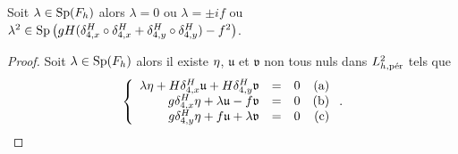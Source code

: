 \begin{proposition}
Soit $\lambda \in \Sp(F_h)$ alors $\lambda = 0$ ou $\lambda = \pm i f$ ou $\lambda^2 \in \Sp \left( gH (\delta_{4,x}^H \circ \delta_{4,x}^H + \delta_{4,y}^H \circ \delta_{4,y}^H) - f^2 \right)$.
\label{prop:spectre_F_h}
\end{proposition}

\begin{proof}
Soit $\lambda \in \Sp(F_h)$ alors il existe $\etafrak$, $\mathfrak{u}$ et $\mathfrak{v}$ non tous nuls dans $L^2_{h,\per}$ tels que
\begin{equation}
\left\lbrace
\begin{array}{rclr}
\lambda \etafrak + H \delta_{4,x}^H \mathfrak{u} + H \delta_{4,y}^H \mathfrak{v} & = & 0 & \text{(a)}\\
g \delta_{4,x}^H \etafrak + \lambda \mathfrak{u} - f \mathfrak{v} & = & 0 & \text{(b)} \\
g \delta_{4,y}^H \etafrak + f \mathfrak{u} + \lambda \mathfrak{v} & = & 0 & \text{(c)}
\end{array}
\right. .
\label{eq:preuve_stab1}
\end{equation}


\end{proof}
